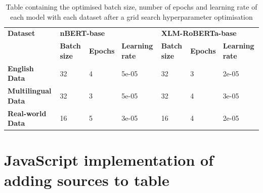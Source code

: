 \documentclass{l4proj}
\begin{document}
\begin{appendices}
\begin{table}[h]
\begin{tabular}{|l|lll|lll|}
\hline
\textbf{Dataset}           & \multicolumn{3}{l|}{\textbf{nBERT-base}}                       & \multicolumn{3}{l|}{\textbf{XLM-RoBERTa-base}}                 \\ \cline{2-7} 
                           & \textbf{Batch size} & \textbf{Epochs} & \textbf{Learning rate} & \textbf{Batch size} & \textbf{Epochs} & \textbf{Learning rate} \\ \hline
\textbf{English Data}      & 32                  & 4               & 5e-05                  & 32                  & 3               & 2e-05                  \\
\textbf{Multilingual Data} & 32                  & 3               & 5e-05                  & 32                  & 4               & 3e-05                  \\
\textbf{Real-world Data}   & 16                  & 5               & 3e-05                  & 16                  & 4               & 2e-05                  \\ \hline
\end{tabular}
\caption{Table containing the optimised batch size, number of epochs and learning rate of each model with each dataset after a grid search hyperparameter optimisation}
\end{table}

\chapter{JavaScript implementation of adding sources to table}
\label{appendix:js-add-sources}


\end{appendices}
\end{document}
